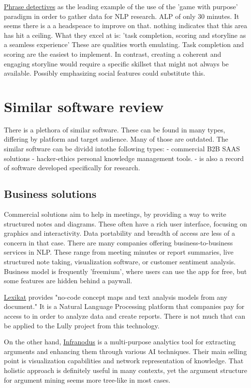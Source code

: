 \documentclass{report}
\begin{document}
\href{https://dl.acm.org/doi/10.1145/2448116.2448119}{Phrase detectives} as the leading example of the use of the 'game with purpose' paradigm in order to gather data for NLP research.
ALP of only 30 minutes. It seems there is a a headspeace to improve on that. nothing indicates that this area has hit a ceiling.
What they excel at is: 'task completion, scoring and storyline as a seamless experience'
These are qualities worth emulating. Task completion and scoring are the easiest to implement. 
In contrast, creating a coherent and engaging storyline would require a specific skillset that might not always be available.
Possibly emphasizing social features could substitute this.

\section{Similar software review}
There is a plethora of similar software. These can be found in many types, differing by platform and target audience. Many of those are outdated.
The similar software can be dividd intothe following types:
- commercial B2B SAAS solutions
- hacker-ethics personal knowledge management tools.
- is also a record of software developed specifically for research.

\subsection{Business solutions}
Commercial solutions aim to help in meetings, by providing a way to write structured notes and diagrams. These often have a rich user interface, focusing on graphics and interactivity.
Data portability and breadth of access are less of a concern in that case.
There are many companies offering business-to-business services in NLP.  These range from meeting minutes or report summaries, live structured note taking, visualization software, or customer sentiment analysis.  Business model is frequently 'freemium', where users can use the app for free, but some features are hidden behind a paywall.

\href{https://lexikat.com/#/}{Lexikat} provides "no-code concept maps and text analysis models from any document." It is a Natural Language Processing platform that companies pay for access to in order to analyze data and create reports. There is not much that can be applied to the Lully project from this technology.

On the other hand, \href{https://infranodus.com/}{Infranodus} is a multi-purpose analytics tool for extracting arguments and enhancing them through various AI techniques. Their main selling point is visualization capabilities and network representation of knowledge. That holistic approach is definitely useful in many contexts, yet the argument structure for argument mining seems more tree-like in most cases.
\end{document}
